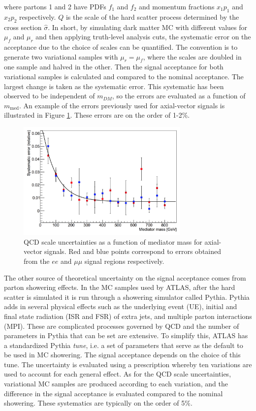 \noindent where partons 1 and 2 have PDFs $f_1$ and $f_2$ and momentum fractions $x_1 p_1$ and $x_2 p_2$ respectively. $Q$ is the scale of the hard scatter process determined by the cross section $\hat{\sigma}$.
In short, by simulating dark matter MC with different values for $\mu_f$ and $\mu_r$ and then applying truth-level analysis cuts, the systematic error on the acceptance due to the choice of scales can be quantified. The convention is to generate two variational samples with $\mu_r = \mu_f$, where the scales are doubled in one sample and halved in the other. Then the signal acceptance for both variational samples is calculated and compared to the nominal acceptance. The largest change is taken as the systematic error. This systematic has been observed to be independent of $m_{DM}$, so the errors are evaluated as a function of $m_\text{med}$. An example of the errors previously used for axial-vector signals is illustrated in Figure \ref{fig:qcd}. These errors are on the order of 1-2\%.

\begin{figure}[htb]
\centering
\includegraphics[width=0.75\textwidth]{Figures/qcd.png}
\caption{QCD scale uncertainties as a function of mediator mass for axial-vector signals. Red and blue points correspond to errors obtained from the $ee$ and $\mu\mu$ signal regions respectively.}
\label{fig:qcd}
\end{figure}

The other source of theoretical uncertainty on the signal acceptance comes from parton showering effects. In the MC samples used by ATLAS, after the hard scatter is simulated it is run through a showering simulator called Pythia. Pythia adds in several physical effects such as the underlying event (UE), initial and final state radiation (ISR and FSR) of extra jets, and multiple parton interactions (MPI). These are complicated processes governed by QCD and the number of parameters in Pythia that can be set are extensive. To simplify this, ATLAS has a standardized Pythia \textit{tune}, i.e. a set of parameters that serve as the default to be used in MC showering. The signal acceptance depends on the choice of this tune. The uncertainty is evaluated using a prescription whereby ten variations are used to account for each general effect. As for the QCD scale uncertainties, variational MC samples are produced according to each variation, and the difference in the signal acceptance is evaluated compared to the nominal showering. These systematics are typically on the order of 5\%.


